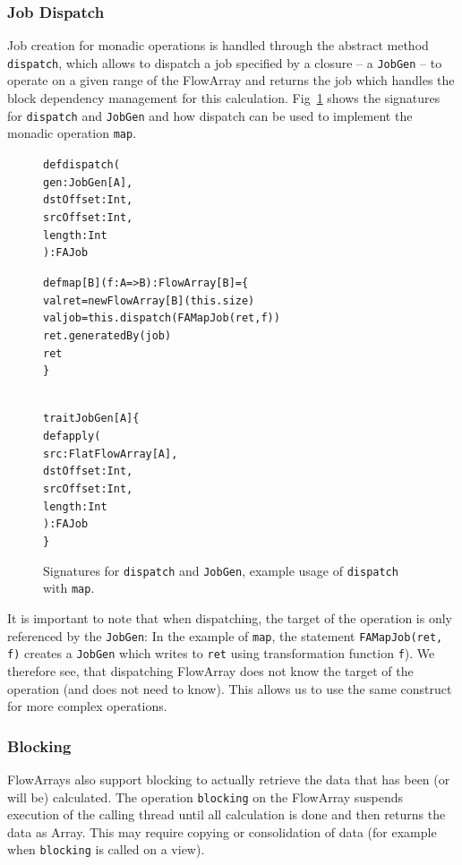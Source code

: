 \documentclass[runningheads,a4paper,fleqn]{llncs}
\begin{document}
\subsubsection{Job Dispatch}
Job creation for monadic operations is handled through the abstract
method \texttt{dispatch}, which allows to dispatch a job specified by
a closure -- a \texttt{JobGen} -- to operate on a given range of the
FlowArray and returns the job which handles the block dependency
management for this calculation. Fig~\ref{fig:dispatch-code} shows the
signatures for \texttt{dispatch} and \texttt{JobGen} and how dispatch
can be used to implement the monadic operation \texttt{map}.

\begin{figure}
\begin{minipage}[t]{6cm}
\begin{alltt}
{\scriptsize
def dispatch(
  gen: JobGen[A],
  dstOffset: Int,
  srcOffset: Int,
  length: Int
): FAJob

def map[B](f: A => B): FlowArray[B] = \{
    val ret = newFlowArray[B](this.size)
    val job = this.dispatch(FAMapJob(ret, f))
    ret.generatedBy(job)
    ret
\}
}
\end{alltt}
\end{minipage}
\begin{minipage}[t]{7cm}
\begin{alltt}
{\scriptsize
trait JobGen[A] \{
  def apply(
    src: FlatFlowArray[A],
    dstOffset: Int,
    srcOffset: Int,
    length: Int
  ): FAJob
\}
}
\end{alltt}
\end{minipage}
\caption{Signatures for \texttt{dispatch} and \texttt{JobGen}, example
  usage of \texttt{dispatch} with \texttt{map}.}
\label{fig:dispatch-code}
\end{figure}

It is important to note that when dispatching, the target of the
operation is only referenced by the \texttt{JobGen}: In the example of
\texttt{map}, the statement \texttt{FAMapJob(ret, f)} creates a
\texttt{JobGen} which writes to \texttt{ret} using transformation
function \texttt{f}). We therefore see, that dispatching FlowArray
does not know the target of the operation (and does not need to
know). This allows us to use the same construct for more complex
operations.

\subsubsection{Blocking}
FlowArrays also support blocking to actually retrieve the data that
has been (or will be) calculated. The operation \texttt{blocking} on
the FlowArray suspends execution of the calling thread until all
calculation is done and then returns the data as Array. This may
require copying or consolidation of data (for example when
\texttt{blocking} is called on a view).
\end{document}
